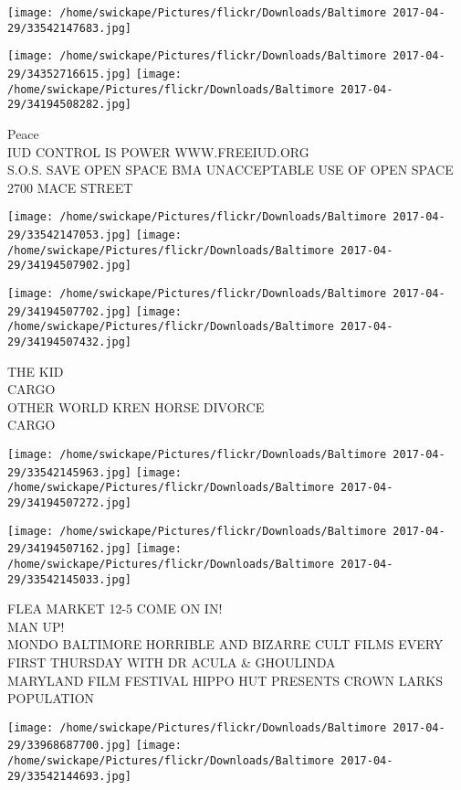 \documentclass[10pt,letterpaper]{article}
\begin{document}
\texttt{[image: /home/swickape/Pictures/flickr/Downloads/Baltimore 2017-04-29/33542147683.jpg]}

\vspace{0.25in}
\texttt{[image: /home/swickape/Pictures/flickr/Downloads/Baltimore 2017-04-29/34352716615.jpg]}
\texttt{[image: /home/swickape/Pictures/flickr/Downloads/Baltimore 2017-04-29/34194508282.jpg]}

Peace\\
IUD CONTROL IS POWER WWW.FREEIUD.ORG\\
S.O.S. SAVE OPEN SPACE BMA UNACCEPTABLE USE OF OPEN SPACE 2700 MACE STREET
\pagebreak

\texttt{[image: /home/swickape/Pictures/flickr/Downloads/Baltimore 2017-04-29/33542147053.jpg]}
\texttt{[image: /home/swickape/Pictures/flickr/Downloads/Baltimore 2017-04-29/34194507902.jpg]}

\texttt{[image: /home/swickape/Pictures/flickr/Downloads/Baltimore 2017-04-29/34194507702.jpg]}
\texttt{[image: /home/swickape/Pictures/flickr/Downloads/Baltimore 2017-04-29/34194507432.jpg]}

THE KID\\
CARGO\\
OTHER WORLD KREN HORSE DIVORCE\\
CARGO
\pagebreak

\texttt{[image: /home/swickape/Pictures/flickr/Downloads/Baltimore 2017-04-29/33542145963.jpg]}
\texttt{[image: /home/swickape/Pictures/flickr/Downloads/Baltimore 2017-04-29/34194507272.jpg]}

\texttt{[image: /home/swickape/Pictures/flickr/Downloads/Baltimore 2017-04-29/34194507162.jpg]}
\texttt{[image: /home/swickape/Pictures/flickr/Downloads/Baltimore 2017-04-29/33542145033.jpg]}

FLEA MARKET 12{-}5 COME ON IN!\\
MAN UP!\\
MONDO BALTIMORE HORRIBLE AND BIZARRE CULT FILMS EVERY FIRST THURSDAY WITH DR ACULA \& GHOULINDA\\
MARYLAND FILM FESTIVAL HIPPO HUT PRESENTS CROWN LARKS POPULATION
\pagebreak

\texttt{[image: /home/swickape/Pictures/flickr/Downloads/Baltimore 2017-04-29/33968687700.jpg]}
\texttt{[image: /home/swickape/Pictures/flickr/Downloads/Baltimore 2017-04-29/33542144693.jpg]}
\end{document}
